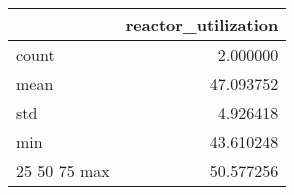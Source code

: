 \begin{tabular}{lr}
\toprule
 & reactor\_utilization \\
\midrule
count & 2.000000 \\
mean & 47.093752 \\
std & 4.926418 \\
min & 43.610248 \\
25%
50%
75%
max & 50.577256 \\
\bottomrule
\end{tabular}

